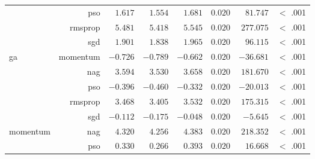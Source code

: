 \begin{table}[htbp]
{\begin{tabular}{lrrrrrrr}
                                       & pso                  & $1.617$              & $1.554$                                         & $1.681$              & $0.020$              & $81.747$             & $<$ .001    \\
                                       & rmsprop              & $5.481$              & $5.418$                                         & $5.545$              & $0.020$              & $277.075$            & $<$ .001    \\
                                       & sgd                  & $1.901$              & $1.838$                                         & $1.965$              & $0.020$              & $96.115$             & $<$ .001    \\
                  ga                   & momentum             & $-0.726$             & $-0.789$                                        & $-0.662$             & $0.020$              & $-36.681$            & $<$ .001    \\
                  $ $                  & nag                  & $3.594$              & $3.530$                                         & $3.658$              & $0.020$              & $181.670$            & $<$ .001    \\
                                       & pso                  & $-0.396$             & $-0.460$                                        & $-0.332$             & $0.020$              & $-20.013$            & $<$ .001    \\
                                       & rmsprop              & $3.468$              & $3.405$                                         & $3.532$              & $0.020$              & $175.315$            & $<$ .001    \\
                                       & sgd                  & $-0.112$             & $-0.175$                                        & $-0.048$             & $0.020$              & $-5.645$             & $<$ .001    \\
                  momentum             & nag                  & $4.320$              & $4.256$                                         & $4.383$              & $0.020$              & $218.352$            & $<$ .001    \\
                  $ $                  & pso                  & $0.330$              & $0.266$                                         & $0.393$              & $0.020$              & $16.668$             & $<$ .001    \\

\end{tabular}}
\end{table}
